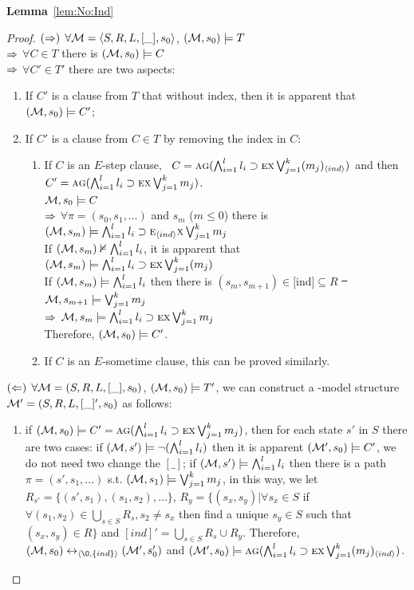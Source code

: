\documentclass{article}
\begin{document}
\textbf{Lemma}~\ref{lem:No:Ind}
\begin{proof}
$(\Rightarrow)$ $\forall {\cal M}={\langle{S,R,L,[\_],s_0}\rangle}$, $({\cal M},s_0) \models T$\\
$\Rightarrow$ $\forall C \in T$ there is $({\cal M},s_0) \models C$ \\
$\Rightarrow$ $\forall C' \in T'$ there are two aspects:
\begin{enumerate}
  \item If $C'$ is a clause from $T$ that without index, then it is apparent that $({\cal M},s_0) \models C'$;
  \item If $C'$ is a clause from $C\in T$ by removing the index in $C$:
  \begin{enumerate}
    \item If $C$ is an $E$-step clause, \ie\ $C=\textsc{a} \textsc{g}(\bigwedge_{i=1}^l l_i \supset \textsc{e} \textsc{x} \bigvee_{j=1}^k (m_j)_{\langle{ind}\rangle})$ and then $C'=\textsc{a} \textsc{g}(\bigwedge_{i=1}^l l_i \supset \textsc{e} \textsc{x} \bigvee_{j=1}^k m_j)$.\\
    ${\cal M},s_0 \models C$\\
        $\Rightarrow$ $\forall \pi=(s_0, s_1,\dots)$ and $s_m$ ($m\leq 0$) there is $({\cal M}, s_m) \models \bigwedge_{i=1}^l l_i \supset \textsc{e}_{\langle{ind}\rangle} \textsc{x} \bigvee_{j=1}^k m_j$\\
        If $({\cal M}, s_m) \nvDash \bigwedge_{i=1}^l l_i$, it is apparent that $({\cal M}, s_m) \models \bigwedge_{i=1}^l l_i \supset \textsc{e} \textsc{x} \bigvee_{j=1}^k (m_j)$ \\
        If $({\cal M}, s_m) \models \bigwedge_{i=1}^l l_i$ then there is $(s_m, s_{m+1}) \in \text{[ind]} \subseteq R$ \st\ ${\cal M}, s_{m+1} \models \bigvee_{j=1}^k m_j$ \\
        $\Rightarrow$ ${\cal M}, s_m \models \bigwedge_{i=1}^l l_i \supset \textsc{e} \textsc{x} \bigvee_{j=1}^k m_j$\\
        Therefore, $({\cal M}, s_0) \models C'$.
    \item If $C$ is an $E$-sometime clause, this can be proved similarly.
  \end{enumerate}
\end{enumerate}
$(\Leftarrow)$ $\forall {\cal M}=(S,R,L,[\_],s_0)$, $({\cal M},s_0) \models T'$, we can construct a \Ind-model structure ${\cal M}'=(S,R, L,[\_]', s_0)$ as follows:
\begin{enumerate}
    \item if $({\cal M},s_0) \models C'=\textsc{a} \textsc{g}(\bigwedge_{i=1}^l l_i \supset \textsc{e} \textsc{x} \bigvee_{j=1}^k m_j)$, then for each state $s'$ in $S$ there are two cases: if $({\cal M},s') \models \neg (\bigwedge_{i=1}^l l_i)$ then it is apparent $({\cal M}', s_0) \models C'$, we do not need two change the $[\_]$; if $({\cal M},s') \models \bigwedge_{i=1}^l l_i$ then there is a path $\pi=(s', s_1,\dots)$ s.t. $({\cal M},s_1) \models \bigvee_{j=1}^k m_j$, in this way, we let $R_{s'}=\{(s',s_1), (s_1, s_2),\dots\}$, $R_y=\{(s_x,s_y)| \forall s_x\in S$ if $\forall (s_1,s_2)\in \bigcup_{s\in S} R_s, s_2\neq s_x$ then find a unique $s_y\in S$ such that $(s_x,s_y)\in R\}$ and $[ind]'= \bigcup_{s\in S} R_s \cup R_y$. Therefore, $(\Hm,s_0) \lrto_{\tuple{{\O}, \{ind\}}} (\Hm',s_0')$ and $({\cal M}',s_0) \models \textsc{a} \textsc{g}(\bigwedge_{i=1}^l l_i \supset \textsc{e} \textsc{x} \bigvee_{j=1}^k (m_j)_{\langle{ind}\rangle})$.

\end{enumerate}
\end{proof}
\end{document}
